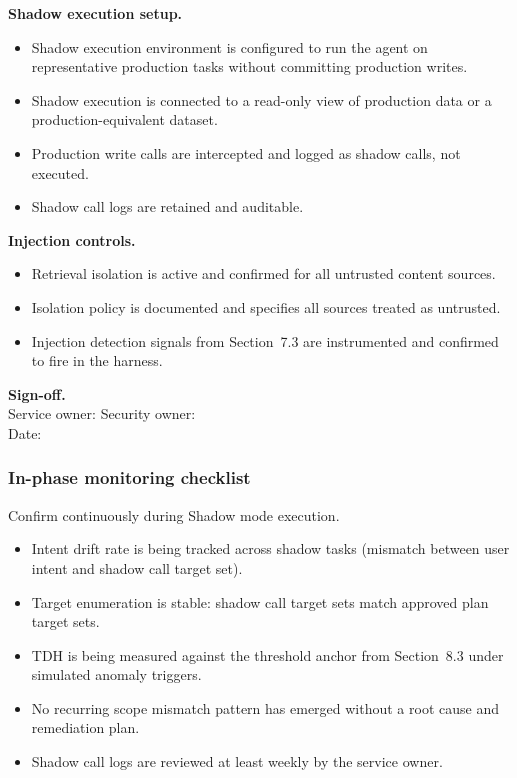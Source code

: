 \documentclass[11pt]{article}
\begin{document}
\textbf{Shadow execution setup.}
\begin{itemize}
  \item Shadow execution environment is configured to run the agent on representative production tasks without committing production writes.
  \item Shadow execution is connected to a read-only view of production data or a production-equivalent dataset.
  \item Production write calls are intercepted and logged as shadow calls, not executed.
  \item Shadow call logs are retained and auditable.
\end{itemize}

\textbf{Injection controls.}
\begin{itemize}
  \item Retrieval isolation is active and confirmed for all untrusted content sources.
  \item Isolation policy is documented and specifies all sources treated as untrusted.
  \item Injection detection signals from Section~7.3 are instrumented and confirmed to fire in the harness.
\end{itemize}

\textbf{Sign-off.}\\Service owner: \underline{\hspace{1.5in}} \quad Security owner: \underline{\hspace{1.5in}}\\Date: \underline{\hspace{1.5in}}

\subsubsection{In-phase monitoring checklist}
Confirm continuously during Shadow mode execution.

\begin{itemize}
  \item Intent drift rate is being tracked across shadow tasks (mismatch between user intent and shadow call target set).
  \item Target enumeration is stable: shadow call target sets match approved plan target sets.
  \item TDH is being measured against the threshold anchor from Section~8.3 under simulated anomaly triggers.
  \item No recurring scope mismatch pattern has emerged without a root cause and remediation plan.
  \item Shadow call logs are reviewed at least weekly by the service owner.
\end{itemize}
\end{document}
